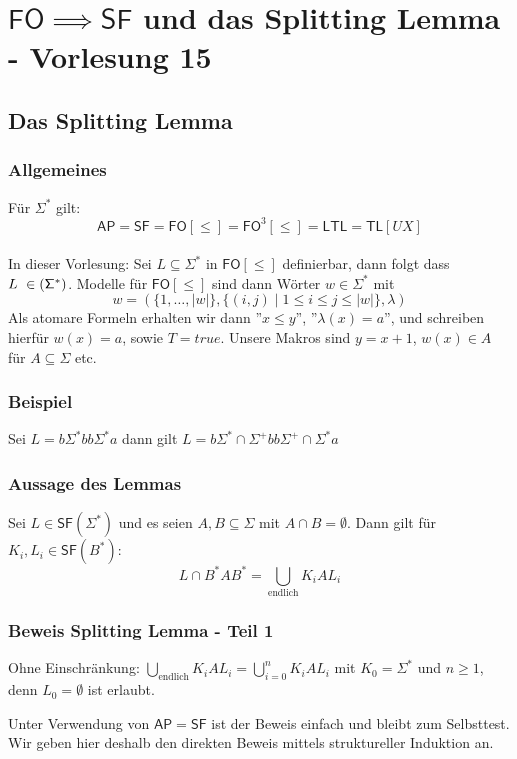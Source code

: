 \documentclass[12pt, german]{article}
\newcommand{\sigstern}{\Sigma^\ast}
\newcommand{\starfree}{\mathsf{SF}}
\newcommand{\bast}{B^{\ast}}
\newcommand{\fo}{\mathsf{FO}}
\newcommand{\ap}{\mathsf{AP}}
\newcommand{\ltl}{\mathsf{LTL}}
\newcommand{\tl}{\mathsf{TL}}
\begin{document}
\section{$\fo \implies \starfree $ und das Splitting Lemma - Vorlesung 15}
\subsection{Das Splitting Lemma}
\subsubsection{Allgemeines}
	Für $\sigstern$ gilt: $$\ap = \starfree = \fo[\leq] = \fo^3[\leq] = \ltl = \tl[UX]$$ \\
	
	In dieser Vorlesung: Sei $L \subseteq \sigstern$ in $\fo[\leq]$ definierbar, dann folgt dass $L \in \sf(\sigstern)$. 
	Modelle für $\fo[\leq]$ sind dann Wörter $w \in \sigstern$ mit $$w = (\{1, \ldots, |w|\}, \{(i,j) \mid 1 \leq i \leq j \leq |w|\}, \lambda)$$
	Als atomare Formeln erhalten wir dann ''$x  \leq y$'', ''$\lambda(x) =a$'', und schreiben hierfür $w(x) = a$, sowie $T = true$.
	Unsere Makros sind $y =x+1$, $w(x) \in A$ für $A\subseteq \Sigma$ etc.

\subsubsection{Beispiel}
	Sei $L = b\sigstern bb \sigstern a $ dann gilt $L = b \sigstern \cap \Sigma^+bb\Sigma^+ \cap \sigstern a$

\subsubsection{Aussage des Lemmas}
	Sei $L \in \starfree(\sigstern)$ und es seien $A, B \subseteq \Sigma$ mit $A \cap B = \emptyset$. Dann gilt für $K_i, L_i \in \starfree(\bast)$: $$L \cap \bast A \bast = \bigcup_{\text{endlich}} K_iAL_i$$
	
\subsubsection{Beweis Splitting Lemma - Teil 1\label{Beweis: 1}}
	Ohne Einschränkung: $\bigcup_{\text{endlich}} K_iAL_i = \bigcup_{i = 0}^n K_iAL_i$ mit $K_0 = \sigstern$ und $n \geq 1$, denn $L_0 = \emptyset$ ist erlaubt. 
	\newline
	
	Unter Verwendung von $\ap = \starfree$ ist der Beweis einfach und bleibt zum Selbsttest. Wir geben hier deshalb den direkten Beweis mittels struktureller Induktion an. 
	\newline
	
\end{document}
